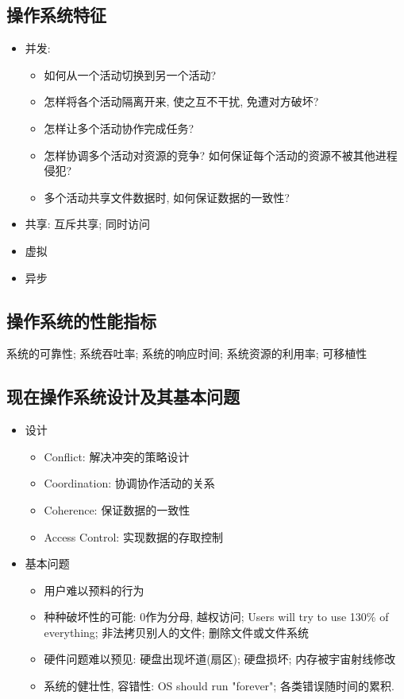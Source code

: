 \documentclass[a4paper, UTF8]{article}
\begin{document}
\subsection{操作系统特征}
\begin{itemize}
\item 并发:
	\begin{itemize}
	\item 如何从一个活动切换到另一个活动?
	\item 怎样将各个活动隔离开来, 使之互不干扰, 免遭对方破坏?
	\item 怎样让多个活动协作完成任务?
	\item 怎样协调多个活动对资源的竞争? 如何保证每个活动的资源不被其他进程侵犯?
	\item 多个活动共享文件数据时, 如何保证数据的一致性?
	\end{itemize}
\item 共享: 互斥共享; 同时访问
\item 虚拟
\item 异步
\end{itemize}

\subsection{操作系统的性能指标}
系统的可靠性; 系统吞吐率; 系统的响应时间; 系统资源的利用率; 可移植性

\subsection{现在操作系统设计及其基本问题}
\begin{itemize}
\item 设计
	\begin{itemize}
	\item Conflict:  解决冲突的策略设计
	\item Coordination: 协调协作活动的关系
	\item Coherence: 保证数据的一致性
	\item Access Control: 实现数据的存取控制
	\end{itemize}
\item 基本问题
	\begin{itemize}
	\item 用户难以预料的行为
	\item 种种破坏性的可能: 0作为分母, 越权访问; Users will try to use 130\% of everything; 非法拷贝别人的文件; 删除文件或文件系统
	\item 硬件问题难以预见: 硬盘出现坏道(扇区); 硬盘损坏; 内存被宇宙射线修改
	\item 系统的健壮性, 容错性: OS should run "forever"; 各类错误随时间的累积.
	
	\end{itemize}
\end{itemize}
\newpage
\end{document}
